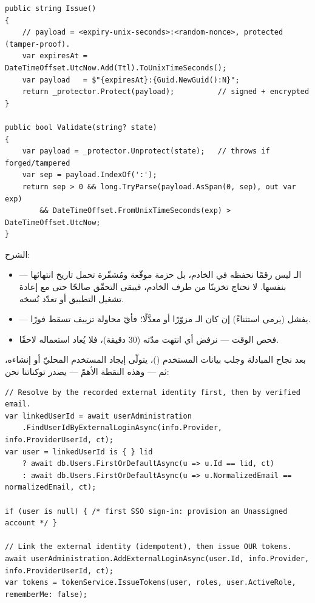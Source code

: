 \begin{english}
\begin{lstlisting}[language={[Sharp]C}]
public string Issue()
{
    // payload = <expiry-unix-seconds>:<random-nonce>, protected (tamper-proof).
    var expiresAt = DateTimeOffset.UtcNow.Add(Ttl).ToUnixTimeSeconds();
    var payload   = $"{expiresAt}:{Guid.NewGuid():N}";
    return _protector.Protect(payload);          // signed + encrypted
}

public bool Validate(string? state)
{
    var payload = _protector.Unprotect(state);   // throws if forged/tampered
    var sep = payload.IndexOf(':');
    return sep > 0 && long.TryParse(payload.AsSpan(0, sep), out var exp)
        && DateTimeOffset.FromUnixTimeSeconds(exp) > DateTimeOffset.UtcNow;
}
\end{lstlisting}
\end{english}

الشرح:
\begin{itemize}
\item {} — الـ ليس رقمًا نحفظه في الخادم، بل حزمة
  موقّعة ومُشفّرة تحمل تاريخ انتهائها بنفسها. لا نحتاج تخزينًا من طرف الخادم، فيبقى
  التحقّق صالحًا حتى مع إعادة تشغيل التطبيق أو تعدّد نُسخه.
\item {} — يفشل (يرمي استثناءً) إن كان الـ مزوّرًا
  أو معدَّلًا؛ فأيّ محاولة تزييف تسقط فورًا.
\item فحص الوقت — نرفض أي  انتهت مدّته (30 دقيقة)، فلا يُعاد استعماله لاحقًا.
\end{itemize}

بعد نجاح المبادلة وجلب بيانات المستخدم ()، يتولّى
 إيجاد المستخدم المحليّ أو إنشاءه، ثم — وهذه النقطة
الأهمّ — يصدر توكناتنا نحن:

\begin{english}
\begin{lstlisting}[language={[Sharp]C}]
// Resolve by the recorded external identity first, then by verified email.
var linkedUserId = await userAdministration
    .FindUserIdByExternalLoginAsync(info.Provider, info.ProviderUserId, ct);
var user = linkedUserId is { } lid
    ? await db.Users.FirstOrDefaultAsync(u => u.Id == lid, ct)
    : await db.Users.FirstOrDefaultAsync(u => u.NormalizedEmail == normalizedEmail, ct);

if (user is null) { /* first SSO sign-in: provision an Unassigned account */ }

// Link the external identity (idempotent), then issue OUR tokens.
await userAdministration.AddExternalLoginAsync(user.Id, info.Provider, info.ProviderUserId, ct);
var tokens = tokenService.IssueTokens(user, roles, user.ActiveRole, rememberMe: false);
\end{lstlisting}
\end{english}

